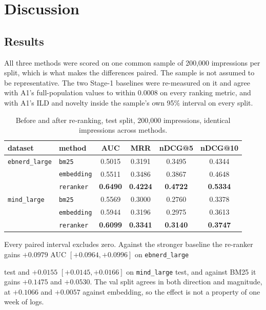 \documentclass[11pt]{article}
\newcommand{\code}[1]{%
    \colorbox{gray!40}{\texttt{#1}}%
}
\begin{document}
\section{Discussion}
\label{sec:discussion}

\subsection{Results}
\label{sec:results}

All three methods were scored on one common sample of 200,000 impressions per
split, which is what makes the differences paired. The sample is not assumed
to be representative. The two Stage-1 baselines were re-measured on it and
agree with A1's full-population values to within 0.0008 on every ranking
metric, and with A1's ILD and novelty inside the sample's own 95\% interval on
every split.

\begin{table}[h]
\centering
\begin{tabular}{llcccc}
\toprule
dataset & method & AUC & MRR & nDCG@5 & nDCG@10 \\
\midrule
\code{ebnerd\_large} & \code{bm25} & 0.5015 & 0.3191 & 0.3495 & 0.4344 \\
                     & \code{embedding} & 0.5511 & 0.3486 & 0.3867 & 0.4648 \\
                     & \code{reranker} & \textbf{0.6490} & \textbf{0.4224} & \textbf{0.4722} & \textbf{0.5334} \\
\midrule
\code{mind\_large}   & \code{bm25} & 0.5569 & 0.3000 & 0.2760 & 0.3378 \\
                     & \code{embedding} & 0.5944 & 0.3196 & 0.2975 & 0.3613 \\
                     & \code{reranker} & \textbf{0.6099} & \textbf{0.3341} & \textbf{0.3140} & \textbf{0.3747} \\
\bottomrule
\end{tabular}
\caption{Before and after re-ranking, test split, 200,000 impressions,
identical impressions across methods.}
\end{table}

Every paired interval excludes zero. Against the stronger baseline the
re-ranker gains $+0.0979$ AUC $[+0.0964, +0.0996]$ on \code{ebnerd\_large}
test and $+0.0155$ $[+0.0145, +0.0166]$ on \code{mind\_large} test, and
against BM25 it gains $+0.1475$ and $+0.0530$. The val split agrees in both
direction and magnitude, at $+0.1066$ and $+0.0057$ against embedding, so the
effect is not a property of one week of logs.
\end{document}
